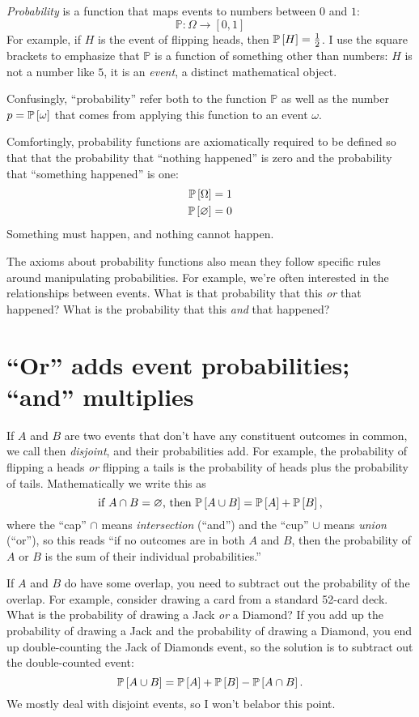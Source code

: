 \emph{Probability} is a function that maps events to numbers between $0$ and
$1$:
\begin{equation*}
\mathbb{P} : \Omega \to [0, 1]
\end{equation*}
For example, if $H$ is the event of flipping heads, then $\mathbb{P}\left[{H}\right] =
\tfrac{1}{2}$. I use the square brackets to emphasize that $\mathbb{P}$ is a
function of something other than numbers: $H$ is not a number like $5$, it is
an \emph{event}, a distinct mathematical object.

Confusingly, ``probability'' refer both to the function $\mathbb{P}$ as well as
the number $p = \mathbb{P}\left[{\omega}\right]$ that comes from applying this function to an
event $\omega$.

Comfortingly, probability functions are axiomatically required to be defined so
that that the probability that ``nothing happened'' is zero and the probability
that ``something happened'' is one:
\begin{align*}
\mathbb{P}\left[{\Omega}\right] &= 1 \\
\mathbb{P}\left[{\varnothing}\right] &= 0
\end{align*}
Something must happen, and nothing cannot happen.

The axioms about probability functions also mean they follow specific rules
around manipulating probabilities. For example, we're often interested in the
relationships between events. What is that probability that this \emph{or} that
happened? What is the probability that this \emph{and} that happened?

\section{``Or'' adds event probabilities; ``and'' multiplies}

If $A$ and $B$ are two events that don't have any constituent outcomes in
common, we call then \emph{disjoint}, and their probabilities add. For example,
the probability of flipping a heads \emph{or} flipping a tails is the
probability of heads plus the probability of tails.  Mathematically we write
this as
$$
\text{if } A \cap B = \varnothing \text{, then } \mathbb{P}\left[{A \cup B}\right] = \mathbb{P}\left[{A}\right] + \mathbb{P}\left[{B}\right],
$$
where the ``cap'' $\cap$ means \emph{intersection} (``and'') and the ``cup'' $\cup$ means
\emph{union} (``or''), so this reads ``if no outcomes are in both $A$ and $B$,
then the probability of $A$ or $B$ is the sum of their individual probabilities.''

If $A$ and $B$ do have some overlap, you need to subtract out the probability
of the overlap. For example, consider drawing a card
from a standard 52-card deck. What is the probability of drawing a Jack \emph{or} a
Diamond? If you add up the probability of drawing a Jack and the probability
of drawing a Diamond, you end up double-counting the Jack of Diamonds event,
so the solution is to subtract out the double-counted event:
$$
\mathbb{P}\left[{A \cup B}\right] = \mathbb{P}\left[{A}\right] + \mathbb{P}\left[{B}\right] - \mathbb{P}\left[{A \cap B}\right].
$$
We mostly deal with disjoint events, so I won't belabor this point.

